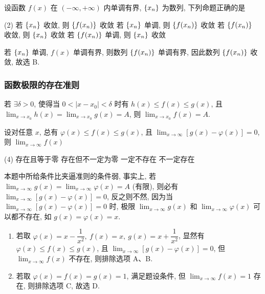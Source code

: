 \begin{example}[2008 数一]
    设函数 $f(x)$ 在 $(-\infty,+\infty)$ 内单调有界, $\qty{x_n}$ 为数列, 下列命题正确的是
    \begin{tasks}(2)
        \task 若 $\qty{x_n}$ 收敛, 则 $\qty{f(x_n)}$ 收敛
        \task 若 $\qty{x_n}$ 单调, 则 $\qty{f(x_n)}$ 收敛
        \task 若 $\qty{f(x_n)}$ 收敛, 则 $\qty{x_n}$ 收敛
        \task 若 $\qty{f(x_n)}$ 单调, 则 $\qty{x_n}$ 收敛
    \end{tasks}
\end{example}
\begin{solution}
    若 $\qty{x_n}$ 单调, $f(x)$ 单调有界, 则数列 $\qty{f(x_n)}$ 单调有界, 因此数列 $\qty{f(x_n)}$ 收敛, 故选 B.
\end{solution}

\subsubsection{函数极限的存在准则}

\begin{theorem}[函数的夹逼准则]
    若 $\exists\delta>0$, 使得当 $0<|x-x_0|<\delta$ 时有 $h(x)\leqslant f(x)\leqslant g(x)$, 且 $\displaystyle \lim_{x \to x_0}h(x)=\lim_{x \to x_0}g(x)=A$, 则 $\displaystyle \lim_{x \to x_0}f(x)=A.$
\end{theorem}

\begin{example}[2000 数三]
    设对任意 $x$, 总有 $\varphi(x)\leqslant f(x)\leqslant g(x)$, 且 $\displaystyle\lim_{x\to\infty}[g(x)-\varphi(x)]=0$, 则 $\displaystyle\lim_{x\to\infty}f(x)$
    \begin{tasks}(4)
        \task 存在且等于零
        \task 存在但不一定为零
        \task 一定不存在
        \task 不一定存在
    \end{tasks}
\end{example}
\begin{solution}
    本题中所给条件比夹逼准则的条件弱, 事实上, 若 $\displaystyle\lim_{x\to\infty}g(x)=\lim_{x\to\infty}\varphi(x)=A$ (有限), 则必有 $\displaystyle\lim_{x\to\infty}[g(x)-\varphi(x)]=0$, 反之则不然, 因为当 $\displaystyle\lim_{x\to\infty}[g(x)-\varphi(x)]=0$ 时,
    极限 $\displaystyle\lim_{x\to\infty}g(x)$ 和 $\displaystyle\lim_{x\to\infty}\varphi(x)$ 可以都不存在, 如 $g(x)=\varphi(x)=x$.
    \begin{enumerate}[label=(\arabic{*})]
        \item 若取 $\varphi(x)=x-\dfrac{1}{x^2},~f(x)=x,~g(x)=x+\dfrac{1}{x^2}$, 显然有 $\varphi(x)\leqslant f(x)\leqslant g(x)$, 且 $\displaystyle\lim_{x\to\infty}[g(x)-\varphi(x)]=0$, 但 $\displaystyle\lim_{x\to\infty}f(x)$ 不存在, 则排除选项 A、B.
        \item 若取 $\varphi(x)=f(x)=g(x)=1$, 满足题设条件, 但 $\displaystyle\lim_{x\to\infty}f(x)=1$ 存在, 则排除选项 C, 故选 D.
    \end{enumerate}
\end{solution}